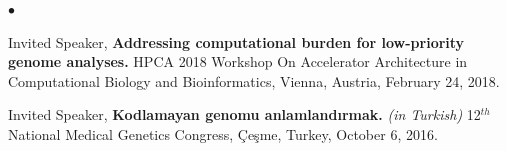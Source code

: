 \documentclass[margin,line]{res}
\newenvironment{list2}{
  \begin{list}{$\bullet$}{%
      \setlength{\itemsep}{0.1cm}
      \setlength{\parsep}{0in} \setlength{\parskip}{0in}
      \setlength{\topsep}{0in} \setlength{\partopsep}{0in} 
      \setlength{\leftmargin}{0.2in}}}{\end{list}}
\newcommand{\junk}[1]{}
\begin{document}
\begin{resume}
\begin{list2}
\item
  Invited Speaker, 
  {\bf Addressing computational burden for low-priority genome analyses.}
  HPCA 2018 Workshop On Accelerator Architecture in Computational Biology and Bioinformatics,
  Vienna, Austria, February 24, 2018.

\junk{
\item
  Lecture, 
  {\bf  Next-generation sequence characterization of complex genome structural variation.}
  Computational Genomics Summer Institute, University of California, Los Angeles, CA, United States,
  July 11, 2017.
}
  \junk{

\item
  Invited Speaker, 
  {\bf Kodlamayan genomu anlamlandırmak.} {\it (in Turkish)}
  3$^{rd}$ Course on Neurogenetics, İstanbul, Turkey, June 1, 2017.
  
  
\item
  Invited Speaker, 
  {\bf Discovery of large genomic inversions using long range information.}
  Institute for Molecular Medicine, University of Lisboa, Lisbon, Portugal, April 7, 2017.
\item
  Invited Speaker, 
  {\bf Discovery of large genomic inversions using long range information.}
  Institute for Computational Biomedicine, Weill Cornell Medicine, New York, NY, USA, January 27, 2017.
  }
\item
  Invited Speaker, 
  {\bf Kodlamayan genomu anlamlandırmak.} {\it (in Turkish)}
  12$^{th}$ National Medical Genetics Congress, Çeşme, Turkey, October 6, 2016.

    \junk{

}
\end{list2}
\end{resume}
\end{document}
